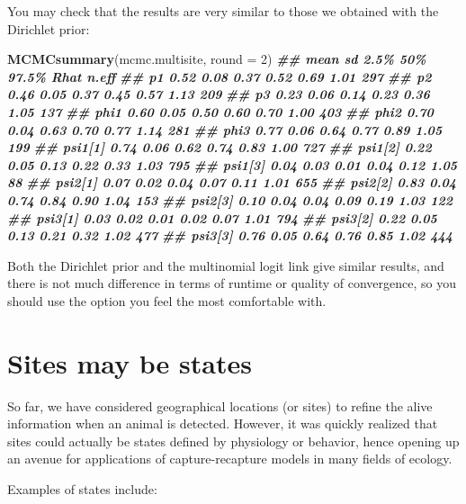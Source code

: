 \documentclass[
  12pt,
]{krantz}
\newenvironment{Shaded}{\begin{snugshade}}{\end{snugshade}}
\newcommand{\AttributeTok}[1]{\textcolor[rgb]{0.13,0.29,0.53}{#1}}
\newcommand{\DecValTok}[1]{\textcolor[rgb]{0.00,0.00,0.81}{#1}}
\newcommand{\DocumentationTok}[1]{\textcolor[rgb]{0.56,0.35,0.01}{\textbf{\textit{#1}}}}
\newcommand{\FunctionTok}[1]{\textcolor[rgb]{0.13,0.29,0.53}{\textbf{#1}}}
\newcommand{\NormalTok}[1]{#1}
\begin{document}
You may check that the results are very similar to those we obtained with the Dirichlet prior:

\begin{Shaded}
\begin{Highlighting}[]
\FunctionTok{MCMCsummary}\NormalTok{(mcmc.multisite, }\AttributeTok{round =} \DecValTok{2}\NormalTok{)}
\DocumentationTok{\#\#         mean   sd 2.5\%  50\% 97.5\% Rhat n.eff}
\DocumentationTok{\#\# p1      0.52 0.08 0.37 0.52  0.69 1.01   297}
\DocumentationTok{\#\# p2      0.46 0.05 0.37 0.45  0.57 1.13   209}
\DocumentationTok{\#\# p3      0.23 0.06 0.14 0.23  0.36 1.05   137}
\DocumentationTok{\#\# phi1    0.60 0.05 0.50 0.60  0.70 1.00   403}
\DocumentationTok{\#\# phi2    0.70 0.04 0.63 0.70  0.77 1.14   281}
\DocumentationTok{\#\# phi3    0.77 0.06 0.64 0.77  0.89 1.05   199}
\DocumentationTok{\#\# psi1[1] 0.74 0.06 0.62 0.74  0.83 1.00   727}
\DocumentationTok{\#\# psi1[2] 0.22 0.05 0.13 0.22  0.33 1.03   795}
\DocumentationTok{\#\# psi1[3] 0.04 0.03 0.01 0.04  0.12 1.05    88}
\DocumentationTok{\#\# psi2[1] 0.07 0.02 0.04 0.07  0.11 1.01   655}
\DocumentationTok{\#\# psi2[2] 0.83 0.04 0.74 0.84  0.90 1.04   153}
\DocumentationTok{\#\# psi2[3] 0.10 0.04 0.04 0.09  0.19 1.03   122}
\DocumentationTok{\#\# psi3[1] 0.03 0.02 0.01 0.02  0.07 1.01   794}
\DocumentationTok{\#\# psi3[2] 0.22 0.05 0.13 0.21  0.32 1.02   477}
\DocumentationTok{\#\# psi3[3] 0.76 0.05 0.64 0.76  0.85 1.02   444}
\end{Highlighting}
\end{Shaded}

Both the Dirichlet prior and the multinomial logit link give similar results, and there is not much difference in terms of runtime or quality of convergence, so you should use the option you feel the most comfortable with.

\section{Sites may be states}\label{states}

So far, we have considered geographical locations (or sites) to refine the alive information when an animal is detected. However, it was quickly realized that sites could actually be states defined by physiology or behavior, hence opening up an avenue for applications of capture-recapture models in many fields of ecology.

Examples of states include:
\end{document}
